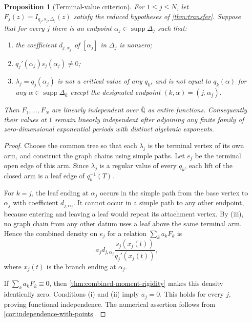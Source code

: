 \documentclass[11pt]{article}
\numberwithin{equation}{section}
\newtheorem{proposition}[proposition]{Proposition}
\theoremstyle{definition}
\theoremstyle{remark}
\newcommand{\Qbar}{\overline{\mathbb Q}}
\newcommand{\supp}{\operatorname{supp}}
\begin{document}
\begin{proposition}[Terminal-value criterion]
\label{prop:terminal-value-criterion}
For $1\le j\le N$, let
$F_j(z)=I_{q_j,s_j,\Delta_j}(z)$ satisfy the reduced hypotheses of
\cref{thm:transfer}.  Suppose that for every $j$ there is an endpoint
$\alpha_j\in\supp\Delta_j$ such that:
\begin{enumerate}[label=\textup{(\roman*)},leftmargin=2.4em]
\item the coefficient $d_{j,\alpha_j}$ of $[\alpha_j]$ in $\Delta_j$ is
nonzero;
\item $q_j'(\alpha_j)s_j(\alpha_j)\ne0$;
\item $\lambda_j=q_j(\alpha_j)$ is not a critical value of any $q_k$, and
is not equal to $q_k(\alpha)$ for any
$\alpha\in\supp\Delta_k$ except the designated endpoint
$(k,\alpha)=(j,\alpha_j)$.
\end{enumerate}
Then $F_1,\ldots,F_N$ are linearly independent over $\Qbar$ as entire
functions.  Consequently their values at $1$ remain linearly independent
after adjoining any finite family of zero-dimensional exponential periods with distinct algebraic
exponents.
\end{proposition}

\begin{proof}
Choose the common tree so that each $\lambda_j$ is the terminal vertex of
its own arm, and construct the graph chains using simple paths.  Let $e_j$
be the terminal open edge of this arm.  Since $\lambda_j$ is a regular value
of every $q_k$, each lift of the closed arm is a leaf edge of
$q_k^{-1}(T)$.

For $k=j$, the leaf ending at $\alpha_j$ occurs in the simple path from the
base vertex to $\alpha_j$ with coefficient $d_{j,\alpha_j}$.  It cannot
occur in a simple path to any other endpoint, because entering and leaving a
leaf would repeat its attachment vertex.  By (iii), no graph chain from any
other datum uses a leaf above the same terminal arm.  Hence the combined
density on $e_j$ for a relation $\sum_k a_kF_k$ is
\[
  a_jd_{j,\alpha_j}
  \frac{s_j(x_j(t))}{q_j'(x_j(t))},
\]
where $x_j(t)$ is the branch ending at $\alpha_j$.

If $\sum_k a_kF_k\equiv0$, then
\cref{thm:combined-moment-rigidity} makes this density identically zero.
Conditions (i) and (ii) imply $a_j=0$.  This holds for every $j$, proving
functional independence.  The numerical assertion follows from
\cref{cor:independence-with-points}.
\end{proof}
\end{document}

